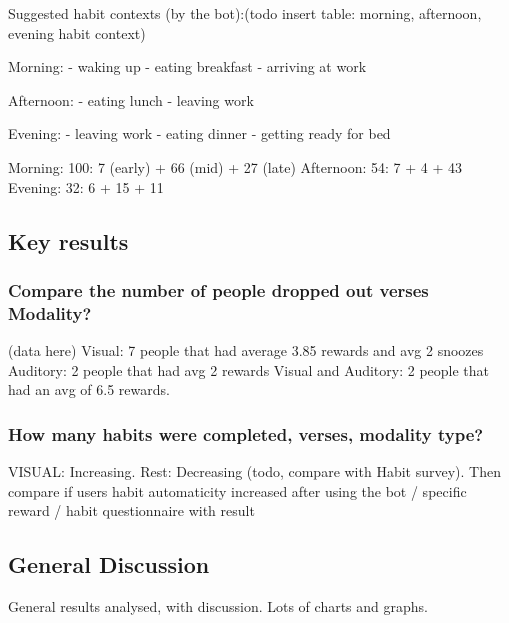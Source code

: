 Suggested habit contexts (by the bot):(todo insert table: morning, afternoon, evening habit context)

Morning:
  - waking up
  - eating breakfast
  - arriving at work

  Afternoon:
  - eating lunch
  - leaving work

  Evening:
  - leaving work
  - eating dinner
  - getting ready for bed

  Morning: 100: 7 (early) + 66 (mid) + 27 (late)
  Afternoon: 54: 7 + 4 + 43
  Evening: 32: 6 + 15 + 11




\subsection*{Key results}

\subsubsection*{Compare the number of people dropped out verses Modality?}
(data here)
Visual: 7 people that had average 3.85 rewards and avg 2 snoozes\newline
Auditory: 2 people that had avg 2 rewards\newline
Visual and Auditory: 2 people that had an avg of 6.5 rewards.


\subsubsection*{How many habits were completed, verses, modality type?}
VISUAL: Increasing. Rest: Decreasing (todo, compare with Habit survey). Then compare if users habit automaticity increased after using the bot / specific reward / habit questionnaire with result





\subsection{General Discussion}
General results analysed, with discussion. Lots of charts and graphs.



